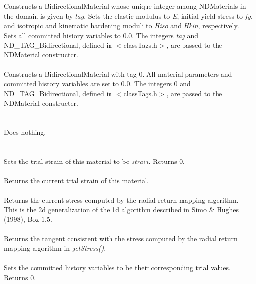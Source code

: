  \\
 \\
Constructs a BidirectionalMaterial whose unique integer among
NDMaterials in the domain is given by {\em tag}.
Sets the elastic modulus to {\em E}, initial yield stress
to {\em fy}, and isotropic and kinematic hardening moduli to 
{\em Hiso} and {\em Hkin}, respectively. Sets all committed history
variables to $0.0$. The integers {\em tag} and ND\_TAG\_Bidirectional, 
defined in $<$classTags.h$>$, are passed to the NDMaterial 
constructor. \\ 

 \\
Constructs a BidirectionalMaterial with tag 0. All material parameters
and committed history variables are set to $0.0$. The integers 0 and 
ND\_TAG\_Bidirectional, defined in $<$classTags.h$>$, are passed to 
the NDMaterial constructor. \\ 

 \\
 \\
Does nothing. \\

 \\
 \\
Sets the trial strain of this material to be {\em strain}. Returns 0. \\

 \\
Returns the current trial strain of this material. \\

 \\
Returns the current stress computed by the radial return mapping algorithm. This
is the 2d generalization of the 1d algorithm described in Simo \& Hughes (1998),
Box $1.5$. \\

 \\
Returns the tangent consistent with the stress computed by the radial
return mapping algorithm in {\em getStress()}. \\

 \\
Sets the committed history variables to be their corresponding trial
values. Returns 0. \\


